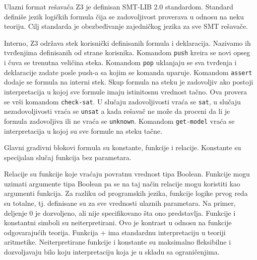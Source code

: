 \documentclass[12pt,oneside]{memoir}
\newtheorem{primer}{Primer}
\begin{document}
\par
Ulazni format rešavača Z3 je definisan SMT-LIB 2.0 standardom. Standard definiše jezik logičkih formula čija se zadovoljivost proverava u odnosu na neku teoriju. Cilj standarda je obezbeđivanje zajedničkog jezika za sve SMT rešavače. 
\par
Interno, Z3 održava stek korisnički definisanih formula i deklaracija. Nazivamo ih tvrđenjima definisanih od strane korisnika. Komandom \texttt{push} kreira se novi opseg i čuva se trenutna veličina steka. Komandom \texttt{pop} uklanjaju se sva tvrđenja i deklaracije zadate posle push-a sa kojim se komanda uparuje. Komandom \texttt{assert} dodaje se formula na interni stek. Skup formula na steku je zadovoljiv ako postoji interpretacija u kojoj sve formule imaju istinitosnu vrednost tačno. Ova provera se vrši komandom \texttt{check-sat}. U slučaju zadovoljivosti vraća se \texttt{sat}, u slučaju nezadovoljivosti vraća se \texttt{unsat} a kada rešavač ne može da proceni da li je formula zadovoljiva ili ne vraća se \texttt{unknown}. Komandom \texttt{get-model} vraća se interpretacija u kojoj su sve formule na steku tačne. 
\par
Glavni gradivni blokovi formula su konstante, funkcije i relacije. Konstante su specijalan slučaj funkcija bez parametara. 

Relacije su funkcije koje vraćaju povratnu vrednost tipa Boolean. Funkcije mogu uzimati argumente tipa Boolean pa se na taj način relacije mogu koristiti kao argumenti funkcija. Za razliku od programskih jezika, funkcije logike prvog reda su totalne, tj. definisane su za sve vrednosti ulaznih parametara. Na primer, deljenje 0 je dozvoljeno, ali nije specifikovano šta ono predstavlja. Funkcije i konstantni simboli su neiterpretirani. Ovo je kontrast u odnosu na funkcije odgovarajućih teorija. Funkcija + ima standardnu interpretaciju u teoriji aritmetike. Neiterpretirane funkcije i konstante su maksimalno fleksibilne i dozvoljavaju bilo koju interpretaciju koja je u skladu sa ograničenjima. 

\end{document}
